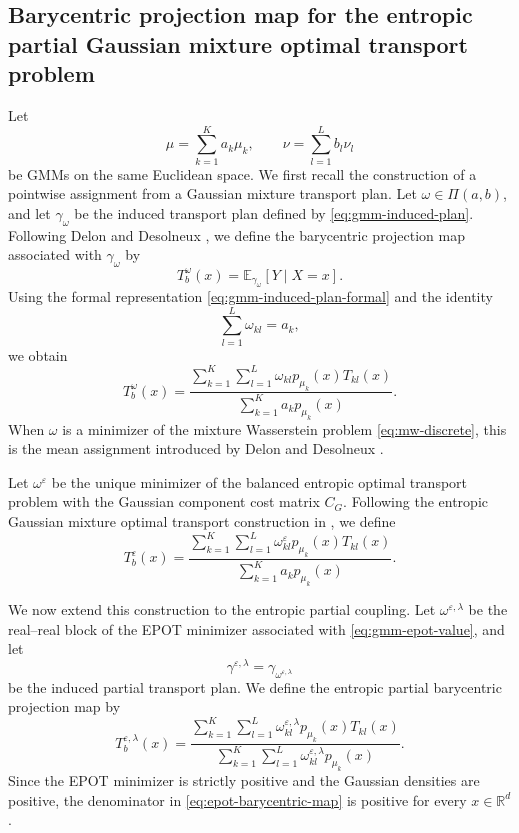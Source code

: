 \documentclass[a4paper,11pt]{article}
\numberwithin{equation}{section}
\newcommand{\eps}{\varepsilon}
\newcommand{\RR}{\mathbb{R}}
\begin{document}
\subsection{Barycentric projection map for the entropic partial Gaussian mixture optimal transport problem}\label{subsec:epot-barycentric}
Let
\begin{equation*}
  \mu=\sum_{k=1}^{K}a_k\mu_k,\qquad \nu=\sum_{l=1}^{L}b_l\nu_l
\end{equation*}
be GMMs on the same Euclidean space. We first recall the construction of a pointwise assignment from a Gaussian mixture transport plan. Let $\omega\in\Pi(a,b)$, and let $\gamma_\omega$ be the induced transport plan defined by \eqref{eq:gmm-induced-plan}. 
Following Delon and Desolneux \cite{delon-2020}, we define the barycentric projection map associated with $\gamma_\omega$ by
\begin{equation*}
  T_b^\omega(x)=\mathbb E_{\gamma_\omega}[Y\mid X=x].
\end{equation*}
Using the formal representation \eqref{eq:gmm-induced-plan-formal} and the identity
\begin{equation*}
  \sum_{l=1}^{L}\omega_{kl}=a_k,
\end{equation*}
we obtain
\begin{equation*}
T_b^\omega(x)=\frac{\displaystyle\sum_{k=1}^{K}\sum_{l=1}^{L}\omega_{kl}p_{\mu_k}(x)T_{kl}(x)}{\displaystyle\sum_{k=1}^{K}a_kp_{\mu_k}(x)}.
\end{equation*}
When $\omega$ is a minimizer of the mixture Wasserstein problem \eqref{eq:mw-discrete}, this is the mean assignment introduced by Delon and Desolneux \cite{delon-2020}.

Let $\omega^\eps$ be the unique minimizer of the balanced entropic optimal transport problem with the Gaussian component cost matrix $C_G$. Following the entropic Gaussian mixture optimal transport construction in \cite{PMID:39710672}, we define
\begin{equation}\label{eq:balanced-entropic-barycentric-map}
T_b^\eps(x)=\frac{\displaystyle\sum_{k=1}^{K}\sum_{l=1}^{L}\omega^\eps_{kl}p_{\mu_k}(x)T_{kl}(x)}{\displaystyle\sum_{k=1}^{K}a_kp_{\mu_k}(x)}.
\end{equation}

We now extend this construction to the entropic partial coupling. Let $\omega^{\eps,\lambda}$ be the real--real block of the EPOT minimizer associated with \eqref{eq:gmm-epot-value}, and let
\begin{equation*}
  \gamma^{\eps,\lambda} = \gamma_{\omega^{\eps,\lambda}}
\end{equation*}
be the induced partial transport plan. We define the entropic partial barycentric projection map by
\begin{equation}\label{eq:epot-barycentric-map}
  T_b^{\eps,\lambda}(x)=\frac{\displaystyle\sum_{k=1}^{K}\sum_{l=1}^{L}\omega^{\eps,\lambda}_{kl}p_{\mu_k}(x)T_{kl}(x)}{\displaystyle\sum_{k=1}^{K}\sum_{l=1}^{L}\omega^{\eps,\lambda}_{kl}p_{\mu_k}(x)}.
\end{equation}
Since the EPOT minimizer is strictly positive and the Gaussian densities are positive, the denominator in \eqref{eq:epot-barycentric-map} is positive for every $x\in\RR^d$.
\end{document}
